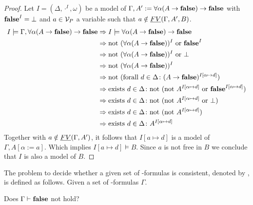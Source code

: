\begin{proof}
	Let $I=(\Delta,\cdot^I,\omega)$ be a model of $\Gamma,A':=\forall\alpha(A\to\textbf{false})\to\textbf{false}$ with $\textbf{false}^I=\bot$ and $a\in\mathcal{V}_P$ a variable such that $a\notin\emph{FV}(\Gamma,A',B)$.
	\begin{align*}
		I\models\Gamma,\forall\alpha(A\to\textbf{false})\to\textbf{false} & \Rightarrow I\models\forall\alpha(A\to\textbf{false})\to\textbf{false}                                                          \\
        & \Rightarrow\text{not}~ (\forall\alpha(A\to\textbf{false}))^I~\text{or}~\textbf{false}^I                                                            \\
        & \Rightarrow\text{not}~ (\forall\alpha(A\to\textbf{false}))^I~\text{or}~\bot                                                                \\
        & \Rightarrow\text{not}~ (\forall\alpha(A\to\textbf{false}))^I                                                                   \\
        & \Rightarrow\text{not}~(\text{forall}~ d\in\Delta\colon(A\to\textbf{false})^{I\left[\alpha\mapsto d\right]})                               \\
        & \Rightarrow\text{exists}~ d\in\Delta\colon\text{not}~(\text{not}~A^{I\left[\alpha\mapsto d\right]}~\text{or}~\textbf{false}^{I\left[\alpha\mapsto d\right]}) \\
        & \Rightarrow\text{exists}~ d\in\Delta\colon\text{not}~(\text{not}~A^{I\left[\alpha\mapsto d\right]}~\text{or}~\bot)                                   \\
        & \Rightarrow\text{exists}~ d\in\Delta\colon\text{not}~(\text{not}~ A^{I\left[\alpha\mapsto d\right]})                                     \\
        & \Rightarrow\text{exists}~ d\in\Delta\colon A^{I\left[\alpha\mapsto d\right]}
	\end{align*}
	Together with $a\notin\emph{FV}(\Gamma,A')$, it follows that $I\left[a\mapsto d\right]$ is a model of $\Gamma,A\left[\alpha:=a\right]$. Which implies $I\left[a\mapsto d\right]\models B$.	Since $a$ is not free in $B$ we conclude that $I$ is also a model of $B$.
\end{proof}
\begin{definition}\label{def.3.4}
	The problem to decide whether a given set of \SysP-formulas is consistent, denoted by \PCons, is defined as follows.
	Given a set of \SysP-formulas $\Gamma$. 
	\begin{center}
		Does $\Gamma\vdash\textbf{false}$ not hold?
	\end{center}
\end{definition}
